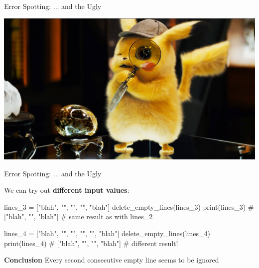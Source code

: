 \begin{frame}[fragile]{Error Spotting: ... and the Ugly}

    \includegraphics[width=\textwidth]{07_Good_Practises/detective-pikachu.jpg}


\end{frame}

\begin{frame}[fragile]{Error Spotting: ... and the Ugly}

    We can try out \textbf{different input values}:

    \begin{pythoncode}
    lines_3 = ["blah", "", "", "", "blah"]
    delete_empty_lines(lines_3)
    print(lines_3)  # ["blah", "", "blah"]
    # same result as with lines_2

    lines_4 = ["blah", "", "", "", "", "blah"]
    delete_empty_lines(lines_4)
    print(lines_4)  # ["blah", "", "", "blah"]
    # different result!
    \end{pythoncode}

    \vspace{0.5em}

    \begin{alertblock}{\textbf{Conclusion}}
        Every second consecutive empty line seems to be ignored
    \end{alertblock}


\end{frame}

